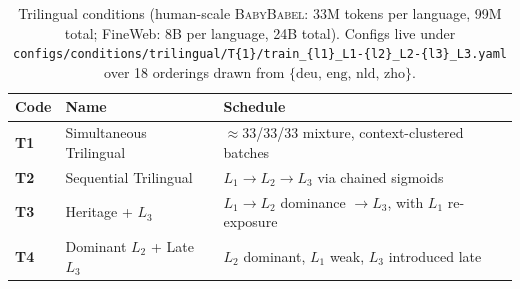 \begin{table}[t]
\centering
\small
\caption{Trilingual conditions (human-scale \textsc{BabyBabel}: 33M tokens per
language, 99M total; FineWeb: 8B per language, 24B total). Configs live under
\texttt{configs/conditions/trilingual/T\{1\}/train\_\{l1\}\_L1-\{l2\}\_L2-\{l3\}\_L3.yaml}
over 18 orderings drawn from $\{\text{deu, eng, nld, zho}\}$.}
\label{tab:trilingual-conditions}
\begin{tabular}{@{}l l l@{}}
\toprule
Code & Name & Schedule \\
\midrule
\textbf{T1} & Simultaneous Trilingual   & $\approx$33/33/33 mixture, context-clustered batches \\
\textbf{T2} & Sequential Trilingual     & $L_1 \to L_2 \to L_3$ via chained sigmoids           \\
\textbf{T3} & Heritage + $L_3$          & $L_1 \to L_2$ dominance $\to L_3$, with $L_1$ re-exposure \\
\textbf{T4} & Dominant $L_2$ + Late $L_3$ & $L_2$ dominant, $L_1$ weak, $L_3$ introduced late  \\
\bottomrule
\end{tabular}
\end{table}


